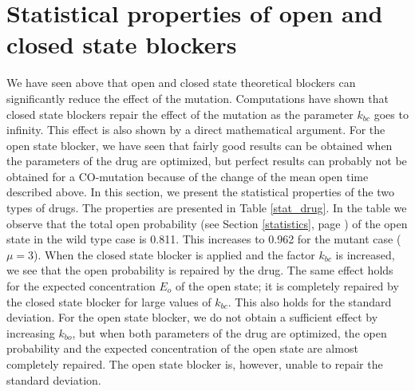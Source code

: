 {\bigskip


\section{Statistical properties of open and closed state blockers}
\label{stat1Ddrg}

We have seen above that open and closed state theoretical blockers can significantly reduce the effect of the mutation. Computations have shown that closed state blockers repair the effect of the mutation as the parameter $k_{bc}$ goes to infinity. This effect is also shown by a direct mathematical argument. For the open state blocker, we have seen that fairly good results can be obtained when the parameters of the drug are optimized, but perfect results can probably not be obtained for a CO-mutation because of the change of the mean open time described above.
In this section, we present the statistical properties of the two types of drugs. The properties are presented in Table \ref{stat_drug}. In the table we observe that the total open probability (see Section \ref{statistics}, page  \pageref{statistics}) of the open state in the wild type case is 0.811. This increases to 0.962 for the mutant case ($\mu=3$). When the closed state blocker is applied and the factor $k_{bc}$ is increased, we see that the open probability is repaired by the drug. The same effect holds for the expected concentration $E_o$ of the open state; it is completely repaired by the closed state blocker for large values of $k_{bc}$. This also holds for the standard deviation. For the open state blocker, we do not obtain a sufficient effect by increasing $k_{bo}$, but when both parameters of the drug are optimized, the open probability and the expected concentration of the open state are almost completely repaired. The open state blocker is, however, unable to repair the standard deviation. 


}
